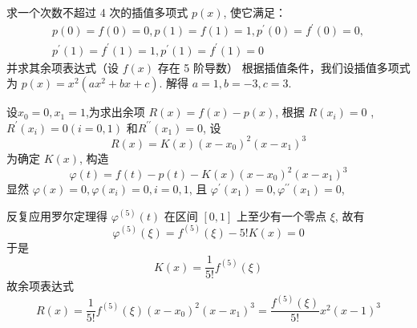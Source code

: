 \begin{tcolorbox}[breakable,
		colframe=white!10!jingga, coltitle=white!90!jingga, colback=white!95!jingga, coltext=black, colbacktitle=white!10!jingga, enhanced, fonttitle=\bfseries,fontupper=\normalsize, attach boxed title to top left={yshift=-2mm}, before skip=8pt, after skip=8pt,
		title=解答题]

求一个次数不超过 4 次的插值多项式 $ p(x) $, 使它满足：
$$
\begin{array}{l}
p(0)=f(0)=0, p(1)=f(1)=1, p^{\prime}(0)=f^{\prime}(0)=0, \\
p^{\prime}(1)=f^{\prime}(1)=1, p^{\prime}(1)=f^{\prime}(1)=0
\end{array}
$$
并求其余项表达式（设 $ f(x) $ 存在 5 阶导数）
\tcblower
根据插值条件，我们设插值多项式为 $ p(x)=x^{2}(ax^{2}+bx+c) $. 解得 $ a=1, b=-3, c=3 $.

设$x_0=0,x_1=1$,为求出余项 $ R(x)=f(x)-p(x) $, 根据 $ R\left(x_{i}\right)=0 $ , $R^{\prime}\left(x_{i}\right)=0(i=0,1) $ 和$R^{\prime\prime}\left(x_{1}\right)=0 $, 设
$$
R(x)=K(x)\left(x-x_{0}\right)^2\left(x-x_{1}\right)^{3}
$$
为确定 $ K(x) $, 构造
$$
\varphi(t)=f(t)-p(t)-K(x)\left(x-x_{0}\right)^2\left(x-x_{1}\right)^{3}
$$
显然 $\varphi(x)=0, \varphi\left(x_{i}\right)=0, i=0,1 $, 且 $\varphi^{\prime}\left(x_{1}\right)=0,\varphi^{\prime\prime}\left(x_{1}\right)=0 $, 

反复应用罗尔定理得 $ \varphi^{(5)}(t) $ 在区间 $ [0, 1] $ 上至少有一个零点 $ \xi $, 故有
$$
\varphi^{(5)}(\xi)=f^{(5)}(\xi)-5 ! K(x)=0
$$
于是
$$
K(x)=\frac{1}{5 !} f^{(5)}(\xi)
$$
故余项表达式
$$
R(x)=\frac{1}{5 !} f^{(5)}(\xi)\left(x-x_{0}\right)^2\left(x-x_{1}\right)^{3}=\frac{f^{(5)}(\xi)}{5!}x^{2}(x-1)^{3}
$$
\end{tcolorbox}






